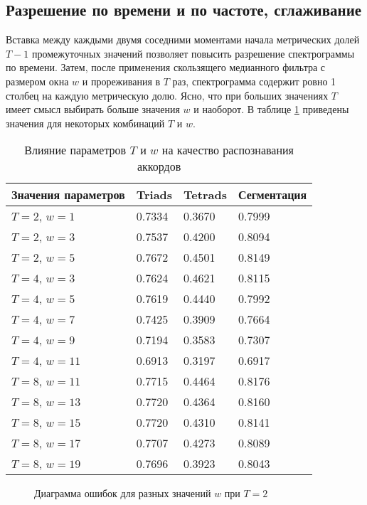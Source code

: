 \subsection{Разрешение по времени и по частоте, сглаживание} \label{ssect3_Tw}

Вставка между каждыми двумя соседними моментами начала метрических долей
$T-1$ промежуточных значений позволяет повысить разрешение спектрограммы по
времени. Затем, после применения скользящего медианного фильтра с размером окна
$w$ и прореживания в $T$ раз, спектрограмма содержит ровно 1 столбец на каждую
метрическую долю. Ясно, что при больших значениях $T$ имеет смысл выбирать
больше значения $w$ и наоборот. В таблице \ref{TTw} приведены значения для
некоторых комбинаций $T$ и $w$.

\begin{table} [htbp]
  \centering
  \parbox{15cm}{\caption{Влияние параметров $T$ и $w$ на качество распознавания
  аккордов} \label{TTw}}
  \begin{tabular}{|l|l|l|l|}
  \hline
  Значения параметров & Triads & Tetrads & Сегментация \\
  \hline
  $T = 2$, $w = 1$ & 0.7334 & 0.3670 & 0.7999 \\
  $T = 2$, $w = 3$ & 0.7537 & 0.4200 & 0.8094 \\
  $T = 2$, $w = 5$ & 0.7672 & 0.4501 & 0.8149 \\
  \hline
  $T = 4$, $w = 3$ & 0.7624 & 0.4621 & 0.8115 \\
  $T = 4$, $w = 5$ & 0.7619 & 0.4440 & 0.7992 \\
  $T = 4$, $w = 7$ & 0.7425 & 0.3909 & 0.7664 \\
  $T = 4$, $w = 9$ & 0.7194 & 0.3583 & 0.7307 \\
  $T = 4$, $w = 11$ & 0.6913 & 0.3197 & 0.6917 \\
  \hline
  $T = 8$, $w = 11$ & 0.7715 & 0.4464 & 0.8176 \\
  $T = 8$, $w = 13$ & 0.7720 & 0.4364 & 0.8160 \\
  $T = 8$, $w = 15$ & 0.7720 & 0.4310 & 0.8141 \\
  $T = 8$, $w = 17$ & 0.7707 & 0.4273 & 0.8089 \\
  $T = 8$, $w = 19$ & 0.7696 & 0.3923 & 0.8043 \\
  \hline
  \end{tabular}
\end{table}

\begin{figure}[htbp]
  \begin{minipage}[h]{0.49\linewidth}
  \end{minipage}
  \hfill
  \begin{minipage}[h]{0.49\linewidth}
  \end{minipage}
  \caption{Диаграмма ошибок для разных значений $w$ при $T=2$}
  \label{img:T2}
\end{figure}

